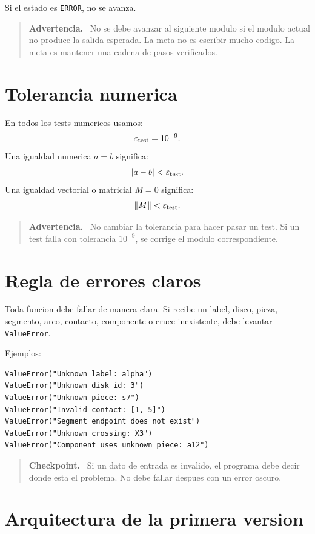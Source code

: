 \documentclass[11pt,letterpaper]{amsart}
\newenvironment{checkpoint}
{\par\medskip\noindent\begin{quote}\textbf{Checkpoint.}\ }
{\end{quote}\par\medskip}
\newenvironment{warningbox}
{\par\medskip\noindent\begin{quote}\textbf{Advertencia.}\ }
{\end{quote}\par\medskip}
\begin{document}
Si el estado es \texttt{ERROR}, no se avanza.

\begin{warningbox}
No se debe avanzar al siguiente modulo si el modulo actual no produce la salida
esperada. La meta no es escribir mucho codigo. La meta es mantener una cadena de
pasos verificados.
\end{warningbox}

\section{Tolerancia numerica}

En todos los tests numericos usamos:
\[
\varepsilon_{\rm test}=10^{-9}.
\]
Una igualdad numerica \(a=b\) significa:
\[
|a-b|<\varepsilon_{\rm test}.
\]
Una igualdad vectorial o matricial \(M=0\) significa:
\[
\|M\|<\varepsilon_{\rm test}.
\]

\begin{warningbox}
No cambiar la tolerancia para hacer pasar un test. Si un test falla con
tolerancia \(10^{-9}\), se corrige el modulo correspondiente.
\end{warningbox}

\section{Regla de errores claros}

Toda funcion debe fallar de manera clara. Si recibe un label, disco, pieza,
segmento, arco, contacto, componente o cruce inexistente, debe levantar
\texttt{ValueError}.

Ejemplos:
\begin{verbatim}
ValueError("Unknown label: alpha")
ValueError("Unknown disk id: 3")
ValueError("Unknown piece: s7")
ValueError("Invalid contact: [1, 5]")
ValueError("Segment endpoint does not exist")
ValueError("Unknown crossing: X3")
ValueError("Component uses unknown piece: a12")
\end{verbatim}

\begin{checkpoint}
Si un dato de entrada es invalido, el programa debe decir donde esta el problema.
No debe fallar despues con un error oscuro.
\end{checkpoint}

\section{Arquitectura de la primera version}
\end{document}
